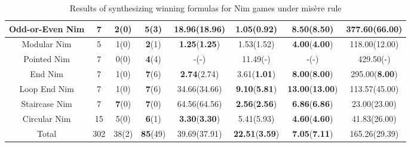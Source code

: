 \documentclass[review]{elsarticle}
\begin{document}
\begin{table}[h!]
{\begin{tabular}{|c|c|c|c|c|c|c|c|}
		Odd-or-Even Nim & 7 & 2(0) & \textbf{5}(3) & 18.96(18.96) & \textbf{1.05}(\textbf{0.92}) & \textbf{8.50}(\textbf{8.50}) & 377.60(66.00) \\ \hline
		Modular Nim & 5 & 1(0) & \textbf{2}(1) & \textbf{1.25}(\textbf{1.25}) & 1.53(1.52) & \textbf{4.00}(\textbf{4.00}) & 118.00(12.00) \\ \hline
		Pointed Nim & 7 & 0(0) & \textbf{4}(4) & -(-) & 11.49(-) & -(-) & 429.50(-) \\ \hline
		End Nim & 7 & 1(0) & \textbf{7}(6) & \textbf{2.74}(2.74) & 3.61(\textbf{1.01}) & \textbf{8.00}(\textbf{8.00}) & 295.00(\textbf{8.00}) \\ \hline
		Loop End Nim & 7 & 1(0) & \textbf{7}(6) & 34.66(34.66) & \textbf{9.10}(\textbf{5.81}) & \textbf{13.00}(\textbf{13.00}) & 113.57(45.00) \\ \hline
		Staircase Nim & 7 & \textbf{7}(0) & \textbf{7}(0) & 64.56(64.56) & \textbf{2.56}(\textbf{2.56}) & \textbf{6.86}(\textbf{6.86}) & 23.00(23.00) \\ \hline
		Circular Nim & 15 & 5(0) & \textbf{6}(1) & \textbf{3.30}(\textbf{3.30}) & 5.41(5.93) & \textbf{4.60}(\textbf{4.60}) & 41.83(26.00) \\ \hline
		Total & 302 & 38(2) & \textbf{85}(49) & 39.69(37.91) & \textbf{22.51}(\textbf{3.59}) & \textbf{7.05}(\textbf{7.11}) & 165.26(29.39) \\ \hline
	\end{tabular}%
	}
	\caption{Results of synthesizing winning formulas for Nim games under mis\`{e}re rule}
	\label{tab:misere-nim-winFormulas}
\end{table}
\end{document}

